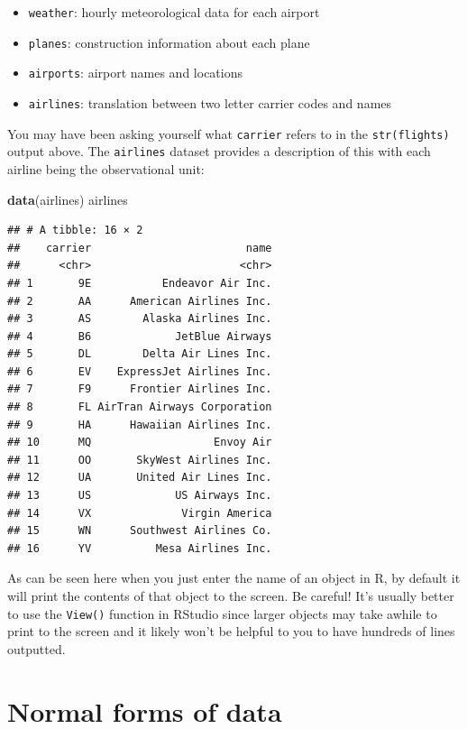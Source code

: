 \documentclass[]{tufte-book}
\newenvironment{Shaded}{\begin{snugshade}}{\end{snugshade}}
\newcommand{\KeywordTok}[1]{\textcolor[rgb]{0.13,0.29,0.53}{\textbf{{#1}}}}
\newcommand{\NormalTok}[1]{{#1}}
\providecommand{\tightlist}{%
  \setlength{\itemsep}{0pt}\setlength{\parskip}{0pt}}
\begin{document}
\begin{itemize}
\tightlist
\item
  \texttt{weather}: hourly meteorological data for each airport
\item
  \texttt{planes}: construction information about each plane
\item
  \texttt{airports}: airport names and locations
\item
  \texttt{airlines}: translation between two letter carrier codes and
  names
\end{itemize}

You may have been asking yourself what \texttt{carrier} refers to in the
\texttt{str(flights)} output above. The \texttt{airlines} dataset
provides a description of this with each airline being the observational
unit:

\begin{Shaded}
\begin{Highlighting}[]
\KeywordTok{data}\NormalTok{(airlines)}
\NormalTok{airlines}
\end{Highlighting}
\end{Shaded}

\begin{verbatim}
## # A tibble: 16 × 2
##    carrier                        name
##      <chr>                       <chr>
## 1       9E           Endeavor Air Inc.
## 2       AA      American Airlines Inc.
## 3       AS        Alaska Airlines Inc.
## 4       B6             JetBlue Airways
## 5       DL        Delta Air Lines Inc.
## 6       EV    ExpressJet Airlines Inc.
## 7       F9      Frontier Airlines Inc.
## 8       FL AirTran Airways Corporation
## 9       HA      Hawaiian Airlines Inc.
## 10      MQ                   Envoy Air
## 11      OO       SkyWest Airlines Inc.
## 12      UA       United Air Lines Inc.
## 13      US             US Airways Inc.
## 14      VX              Virgin America
## 15      WN      Southwest Airlines Co.
## 16      YV          Mesa Airlines Inc.
\end{verbatim}

As can be seen here when you just enter the name of an object in R, by
default it will print the contents of that object to the screen. Be
careful! It's usually better to use the \texttt{View()} function in
RStudio since larger objects may take awhile to print to the screen and
it likely won't be helpful to you to have hundreds of lines outputted.

\section{Normal forms of data}\label{normal-forms-of-data}
\end{document}
